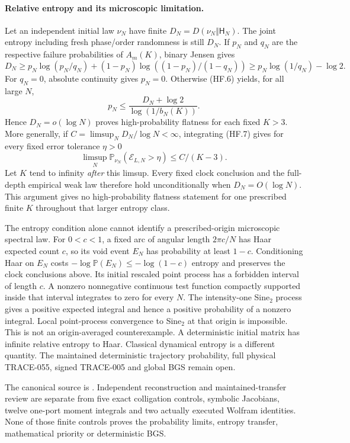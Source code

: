 \paragraph{Relative entropy and its microscopic limitation.}
Let an independent initial law $\nu_N$ have finite
$D_N=D(\nu_N\Vert\mathsf H_N)$. The joint entropy including fresh
phase/order randomness is still $D_N$. If $p_N$ and $q_N$ are the
respective failure probabilities of $A_m(K)$, binary Jensen gives
\[
 D_N\ge p_N\log(p_N/q_N)
       +(1-p_N)\log((1-p_N)/(1-q_N))
       \ge p_N\log(1/q_N)-\log2.
\]
For $q_N=0$, absolute continuity gives $p_N=0$.
Otherwise (HF.6) yields, for all large $N$,
\[
 p_N\le\frac{D_N+\log2}{\log(1/b_N(K))}.               \tag{HF.8}
\]
Hence $D_N=o(\log N)$ proves high-probability flatness for each
fixed $K>3$. More generally, if
$C=\limsup_N D_N/\log N<\infty$, integrating (HF.7) gives
for every fixed error tolerance $\eta>0$
\[
 \limsup_N\mathbb P_{\nu_N}(\mathcal E_{L,N}>\eta)
       \le C/(K-3).
\]
Let $K$ tend to infinity \emph{after} this limsup. Every fixed clock
conclusion and the full-depth empirical weak law therefore hold
unconditionally when $D_N=O(\log N)$. This argument gives no
high-probability flatness statement for one prescribed finite $K$
throughout that larger entropy class.

The entropy condition alone cannot identify a prescribed-origin
microscopic spectral law. For $0<c<1$, a fixed arc of angular length
$2\pi c/N$ has Haar expected count $c$, so its void event $E_N$ has
probability at least $1-c$. Conditioning Haar on $E_N$ costs
$-\log\mathbb P(E_N)\le-\log(1-c)$ entropy and preserves the clock
conclusions above. Its initial rescaled point process has a forbidden
interval of length $c$. A nonzero nonnegative continuous test function
compactly supported inside that interval integrates to zero for every $N$.
The intensity-one Sine$_2$ process gives a positive expected integral
and hence a positive probability of a nonzero integral. Local
point-process convergence to Sine$_2$ at that origin is impossible.
This is not an origin-averaged counterexample. A deterministic initial
matrix has infinite relative entropy to Haar. Classical dynamical
entropy is a different quantity. The maintained deterministic
trajectory probability, full physical TRACE-055, signed TRACE-005 and
global BGS remain open.

The canonical source is
.
Independent reconstruction and maintained-transfer review are separate
from five exact colligation controls, symbolic Jacobians, twelve
one-port moment integrals and two actually executed Wolfram identities.
None of those finite controls proves the probability limits,
entropy transfer, mathematical priority or deterministic BGS.

